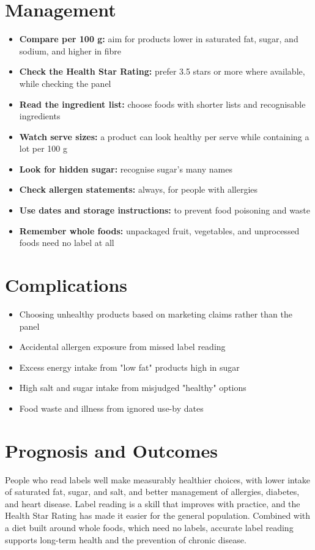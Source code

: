 \section*{Management}
\begin{itemize}
    \item \textbf{Compare per 100 g:} aim for products lower in saturated fat, sugar, and sodium, and higher in fibre
    \item \textbf{Check the Health Star Rating:} prefer 3.5 stars or more where available, while checking the panel
    \item \textbf{Read the ingredient list:} choose foods with shorter lists and recognisable ingredients
    \item \textbf{Watch serve sizes:} a product can look healthy per serve while containing a lot per 100 g
    \item \textbf{Look for hidden sugar:} recognise sugar's many names
    \item \textbf{Check allergen statements:} always, for people with allergies
    \item \textbf{Use dates and storage instructions:} to prevent food poisoning and waste
    \item \textbf{Remember whole foods:} unpackaged fruit, vegetables, and unprocessed foods need no label at all
\end{itemize}

\section*{Complications}
\begin{itemize}
    \item Choosing unhealthy products based on marketing claims rather than the panel
    \item Accidental allergen exposure from missed label reading
    \item Excess energy intake from "low fat" products high in sugar
    \item High salt and sugar intake from misjudged "healthy" options
    \item Food waste and illness from ignored use-by dates
\end{itemize}

\section*{Prognosis and Outcomes}
People who read labels well make measurably healthier choices, with lower intake of saturated fat, sugar, and salt, and better management of allergies, diabetes, and heart disease. Label reading is a skill that improves with practice, and the Health Star Rating has made it easier for the general population. Combined with a diet built around whole foods, which need no labels, accurate label reading supports long-term health and the prevention of chronic disease.

